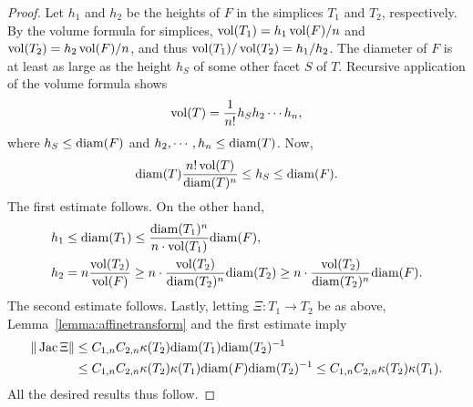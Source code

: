 \documentclass[10pt,letterpaper]{article}
\begin{document}


\begin{proof}
    Let $h_1$ and $h_2$ be the heights of $F$ in the simplices $T_1$ and $T_2$, respectively. 
    By the volume formula for simplices, $\operatorname{vol}(T_1) = h_1 \operatorname{vol}(F)/n$ and $\operatorname{vol}(T_2) = h_2 \operatorname{vol}(F)/n$, and thus $\operatorname{vol}(T_1)/\operatorname{vol}(T_2) = h_1/h_2$.
    The diameter of $F$ is at least as large as the height $h_S$ of some other facet $S$ of $T$. Recursive application of the volume formula shows 
    \begin{align*}
        \operatorname{vol}(T) = \frac{1}{n!} h_S h_2 \cdots h_n,
    \end{align*}
    where $h_S \leq {\operatorname{diam}}(F)$ and $h_2, \cdots, h_n \leq {\operatorname{diam}}(T)$. Now, 
    \begin{align*}
        {\operatorname{diam}}(T) \frac{ n! \operatorname{vol}(T) }{ {\operatorname{diam}}(T)^{n} } \leq h_S \leq {\operatorname{diam}}(F).
    \end{align*}
    The first estimate follows. 
    On the other hand, 
    \begin{align*}
        h_1 &\leq {\operatorname{diam}}(T_1) \leq \frac{{\operatorname{diam}}(T_1)^{n}}{n \cdot \operatorname{vol}(T_1)} {\operatorname{diam}}(F),
        \\
        h_2 &= n \frac{\operatorname{vol}(T_2)}{\operatorname{vol}(F)} \geq n \cdot \frac{\operatorname{vol}(T_2)}{{\operatorname{diam}}(T_2)^{n}} {\operatorname{diam}}(T_2) \geq n \cdot \frac{\operatorname{vol}(T_2)}{{\operatorname{diam}}(T_2)^{n}} {\operatorname{diam}}(F)
        .
    \end{align*}
    The second estimate follows. 
    Lastly, letting $\Xi : T_1 \rightarrow T_2$ be as above, Lemma~\eqref{lemma:affinetransform} and the first estimate imply 
    \begin{align*}
        \| \operatorname{{\rm Jac}} \Xi \|
        &
        \leq 
        C_{1,n}
        C_{2,n}
        \kappa(T_2)
        {\operatorname{diam}}(T_1)
        {\operatorname{diam}}(T_2)^{-1}
        \\&
        \leq 
        C_{1,n}
        C_{2,n}
        \kappa(T_2)
        \kappa(T_1) 
        {\operatorname{diam}}(F)
        {\operatorname{diam}}(T_2)^{-1}
        \leq 
        C_{1,n}
        C_{2,n}
        \kappa(T_2)
        \kappa(T_1) 
        .
    \end{align*}
    All the desired results thus follow.
\end{proof}
\end{document}

